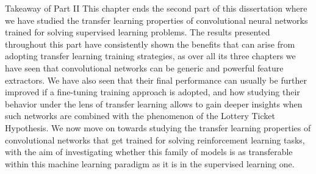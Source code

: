 \begin{takeaway}{Takeaway of Part II}
	This chapter ends the second part of this dissertation where we have studied the transfer learning properties of convolutional neural networks trained for solving supervised learning problems. The results presented throughout this part have consistently shown the benefits that can arise from adopting transfer learning training strategies, as over all its three chapters we have seen that convolutional networks can be generic and powerful feature extractors. We have also seen that their final performance can usually be further improved if a fine-tuning training approach is adopted, and how studying their behavior under the lens of transfer learning allows to gain deeper insights when such networks are combined with the phenomenon of the Lottery Ticket Hypothesis. We now move on towards studying the transfer learning properties of convolutional networks that get trained for solving reinforcement learning tasks, with the aim of investigating whether this family of models is as transferable within this machine learning paradigm as it is in the supervised learning one.
\end{takeaway}


